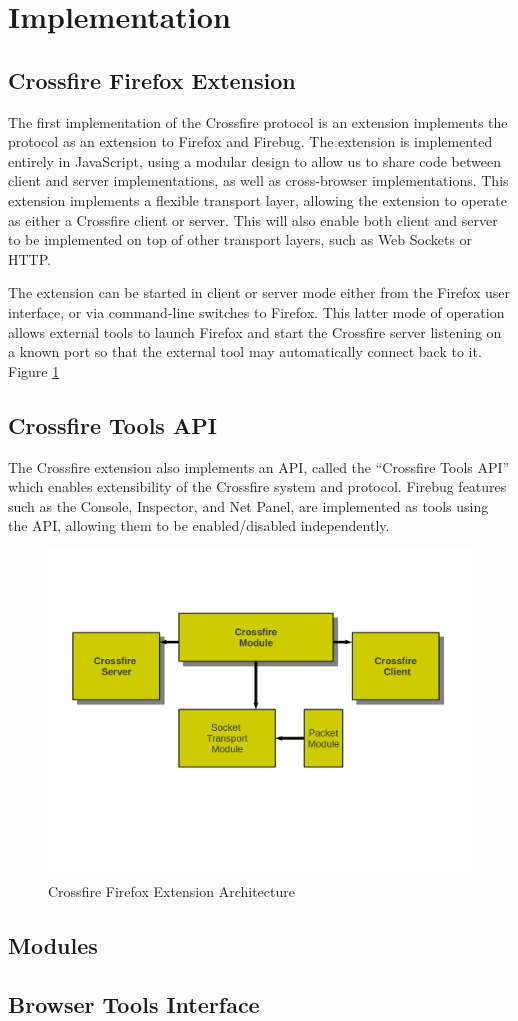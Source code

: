 \section{Implementation}

\subsection{Crossfire Firefox Extension}
The first implementation of the Crossfire protocol is an extension implements
the protocol as an extension to Firefox and Firebug. The extension is
implemented entirely in JavaScript, using a modular design to allow us to share
code between client and server implementations, as well as cross-browser
implementations. This extension implements a flexible transport layer, allowing
the extension to operate as either a Crossfire client or server. This will also
enable both client and server to be implemented on top of other transport
layers, such as Web Sockets or HTTP.

The extension can be started in client or server mode either from the Firefox
user interface, or via command-line switches to Firefox. This latter mode of
operation allows external tools to launch Firefox and start the Crossfire server
listening on a known port so that the external tool may automatically connect
back to it. Figure \ref{fig:crossfire-arch}

\subsection{Crossfire Tools API}
The Crossfire extension also implements an API, called the ``Crossfire Tools API''
which enables extensibility of the Crossfire system and protocol. Firebug
features such as the Console, Inspector, and Net Panel, are implemented as tools
using the API, allowing them to be enabled/disabled independently.

\begin{figure}[htp]
  \includegraphics  [width = 86 mm] {figures/crossfire-arch4.png}
  \caption{Crossfire Firefox Extension Architecture}
 \label{fig:crossfire-arch}
\end{figure}

\subsection{Modules}

\subsection {Browser Tools Interface}